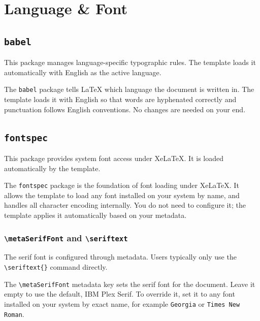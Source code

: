 \section{Language \& Font}

\subsection{\texttt{babel}}
\noindent\colorbox{themecolour!15}{\parbox{\linewidth}{\small This package manages language-specific typographic rules. The template loads it automatically with English as the active language.}}\vspace{0.5\baselineskip}

The \texttt{babel} package tells \LaTeX{} which language the document is written in. The template loads it with English so that words are hyphenated correctly and punctuation follows English conventions. No changes are needed on your end.

\subsection{\texttt{fontspec}}
\noindent\colorbox{themecolour!15}{\parbox{\linewidth}{\small This package provides system font access under XeLaTeX. It is loaded automatically by the template.}}\vspace{0.5\baselineskip}

The \texttt{fontspec} package is the foundation of font loading under Xe\LaTeX{}. It allows the template to load any font installed on your system by name, and handles all character encoding internally. You do not need to configure it; the template applies it automatically based on your metadata.

\subsubsection{\texttt{\textbackslash metaSerifFont} and \texttt{\textbackslash seriftext}}
\noindent\colorbox{themecolour!15}{\parbox{\linewidth}{\small The serif font is configured through metadata. Users typically only use the \texttt{\textbackslash seriftext\{\}} command directly.}}\vspace{0.5\baselineskip}

The \texttt{\textbackslash metaSerifFont} metadata key sets the serif font for the document. Leave it empty to use the default, IBM Plex Serif. To override it, set it to any font installed on your system by exact name, for example \texttt{Georgia} or \texttt{Times New Roman}.

